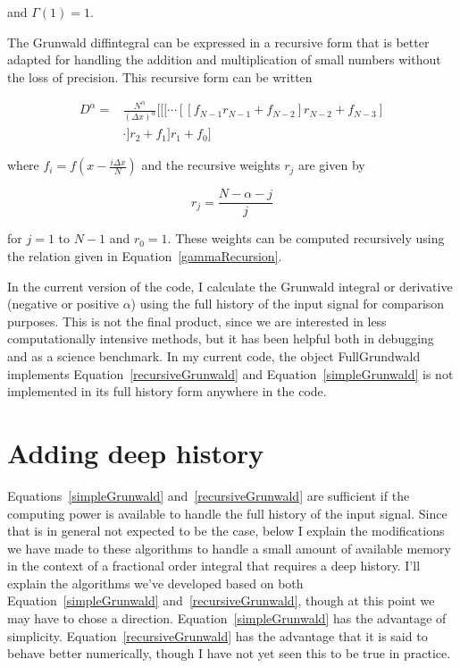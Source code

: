 \documentclass[12]{article}
\begin{document}
\noindent and $\Gamma(1) = 1$. 

The Grunwald diffintegral can be expressed in a recursive form that
is better adapted for handling the addition and multiplication of
small numbers without the loss of precision. This recursive form can
be written

\begin{eqnarray}
D^\alpha = &\frac{N^\alpha}{(\Delta x)^\alpha}[[[\cdots
[[f_{N-1}r_{N-1}+f_{N-2}]r_{N-2}+f_{N-3}]\nonumber \\
&\cdot]r_2+f_1]r_1+f_0]
\label{recursiveGrunwald}
\end{eqnarray}

\noindent where $f_i= f(x-\frac{i \Delta x}{N})$ and the recursive
weights $r_j$ are given by

\begin{equation}
r_j = \frac{N-\alpha-j}{j}
\label{rj}
\end{equation}

\noindent for $j=1$ to $N-1$ and $r_0=1$. These weights can be
computed recursively using the relation given in
Equation~\ref{gammaRecursion}.

In the current version of the code, I calculate the Grunwald integral
or derivative (negative or positive $\alpha$) using the full history of
the input signal for comparison purposes. This is not the final
product, since we are interested in less computationally intensive
methods, but it has been helpful both in debugging and as a science
benchmark. In my current code, the object FullGrundwald implements
Equation~\ref{recursiveGrunwald} and Equation~\ref{simpleGrunwald} is
not implemented in its full history form anywhere in the code.

\section{Adding deep history}

Equations~\ref{simpleGrunwald} and~\ref{recursiveGrunwald} are
sufficient if the computing power is available to handle the full
history of the input signal. Since that is in general not expected to
be the case, below I explain the modifications we have made to these
algorithms to handle a small amount of available memory in the context
of a fractional order integral that requires a deep history. I'll
explain the algorithms we've developed based on both
Equation~\ref{simpleGrunwald} and~\ref{recursiveGrunwald}, though at
this point we may have to chose a
direction. Equation~\ref{simpleGrunwald} has the advantage of
simplicity. Equation~\ref{recursiveGrunwald} has the advantage that it
is said to behave better numerically, though I have not yet seen this
to be true in practice.
\end{document}

